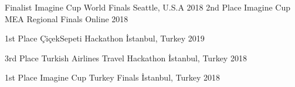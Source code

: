 
\vspace*{-1.5mm}

\vspace*{-1.5mm}

\begin{cvhonors}
  \cvhonor
    {Finalist}%
    {Imagine Cup World Finals}%
    {Seattle, U.S.A}%
    {2018}%
  \cvhonor
    {2nd Place}
    {Imagine Cup MEA Regional Finals} %
    {Online}
    {2018}
\end{cvhonors}


\vspace*{-1.5mm}

\begin{cvhonors}
  \cvhonor
    {1st Place}
    {ÇiçekSepeti Hackathon}
    {İstanbul, Turkey}
    {2019}

  \cvhonor
    {3rd Place}
    {Turkish Airlines Travel Hackathon}
    {İstanbul, Turkey}
    {2018}

   \cvhonor
    {1st Place}
    {Imagine Cup Turkey Finals}
    {İstanbul, Turkey}
    {2018}

\end{cvhonors}

